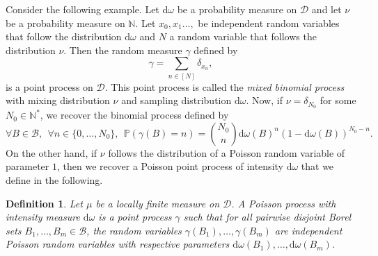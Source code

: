 \documentclass[twoside,11pt]{book}
\newtheorem{definition}{Definition}
\newtheorem{example}{Example}
\numberwithin{theorem}{chapter}
\numberwithin{definition}{chapter}
\numberwithin{proposition}{chapter}
\numberwithin{corollary}{chapter}
\numberwithin{example}{chapter}
\numberwithin{lemma}{chapter}
\numberwithin{assumption}{chapter}
\begin{document}
Consider the following example. Let $\mathrm{d}\omega$ be a probability measure on $\mathcal{D}$ and let $\nu$ be a probability measure on $\mathbb{N}$. Let $x_{0}, x_{1} \dots, $ be independent random variables that follow the distribution $\mathrm{d}\omega$ and $N$ a random variable that follows the distribution $\nu$.
Then the random measure $\gamma$ defined by
\begin{equation}
\gamma = \sum\limits_{n \in [N]} \delta_{x_{n}},
\end{equation}
is a point process on $\mathcal{D}$. This point process is called the \emph{mixed binomial process} with mixing distribution $\nu$ and sampling distribution $\mathrm{d}\omega$.
Now, if  $\nu = \delta_{N_0}$ for some $N_0 \in \mathbb{N}^{*}$, we recover the binomial process defined by
\begin{equation}\label{eq:binomial_cylinder_prb}
\forall B \in \mathcal{B}, \:\:\forall n \in \{0, \dots, N_0\}, \:\: \mathbb{P}(\gamma(B) = n) = \binom{N_0}{n}\mathrm{d}\omega(B)^{n}(1-\mathrm{d}\omega(B))^{N_0-n}.
\end{equation}
On the other hand, if $\nu$ follows the distribution of a Poisson random variable of parameter $1$, then we recover a Poisson point process of intensity $\mathrm{d}\omega$ that we define in the following.
\begin{definition}
Let $\mu$ be a locally finite measure on $\mathcal{D}$. A Poisson process with intensity measure $\mathrm{d}\omega$ is a point process $\gamma$ such that for all pairwise disjoint Borel sets $B_{1}, \dots, B_{m} \in \mathcal{B}$, the random variables $\gamma(B_{1}), \dots, \gamma(B_{m})$ are independent Poisson random variables with respective parameters $\mathrm{d}\omega(B_{1}), \dots, \mathrm{d}\omega(B_{m})$.

\end{definition}
\end{document}
